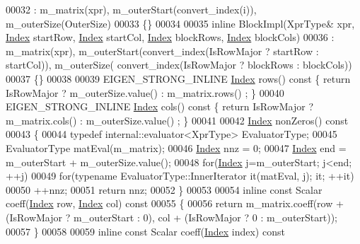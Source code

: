 \begin{DoxyCode}
00032       : m\_matrix(xpr), m\_outerStart(convert\_index(i)), m\_outerSize(OuterSize)
00033     \{\}
00034 
00035     \textcolor{keyword}{inline} BlockImpl(XprType& xpr, \hyperlink{namespace_eigen_a62e77e0933482dafde8fe197d9a2cfde}{Index} startRow, \hyperlink{namespace_eigen_a62e77e0933482dafde8fe197d9a2cfde}{Index} startCol, 
      \hyperlink{namespace_eigen_a62e77e0933482dafde8fe197d9a2cfde}{Index} blockRows, \hyperlink{namespace_eigen_a62e77e0933482dafde8fe197d9a2cfde}{Index} blockCols)
00036       : m\_matrix(xpr), m\_outerStart(convert\_index(IsRowMajor ? startRow : startCol)), m\_outerSize(
      convert\_index(IsRowMajor ? blockRows : blockCols))
00037     \{\}
00038 
00039     EIGEN\_STRONG\_INLINE \hyperlink{namespace_eigen_a62e77e0933482dafde8fe197d9a2cfde}{Index} rows()\textcolor{keyword}{ const }\{ \textcolor{keywordflow}{return} IsRowMajor ? m\_outerSize.value() : m\_matrix.rows()
      ; \}
00040     EIGEN\_STRONG\_INLINE \hyperlink{namespace_eigen_a62e77e0933482dafde8fe197d9a2cfde}{Index} cols()\textcolor{keyword}{ const }\{ \textcolor{keywordflow}{return} IsRowMajor ? m\_matrix.cols() : m\_outerSize.value()
      ; \}
00041 
00042     \hyperlink{namespace_eigen_a62e77e0933482dafde8fe197d9a2cfde}{Index} nonZeros()\textcolor{keyword}{ const}
00043 \textcolor{keyword}{    }\{
00044       \textcolor{keyword}{typedef} internal::evaluator<XprType> EvaluatorType;
00045       EvaluatorType matEval(m\_matrix);
00046       \hyperlink{namespace_eigen_a62e77e0933482dafde8fe197d9a2cfde}{Index} nnz = 0;
00047       \hyperlink{namespace_eigen_a62e77e0933482dafde8fe197d9a2cfde}{Index} end = m\_outerStart + m\_outerSize.value();
00048       \textcolor{keywordflow}{for}(\hyperlink{namespace_eigen_a62e77e0933482dafde8fe197d9a2cfde}{Index} j=m\_outerStart; j<end; ++j)
00049         \textcolor{keywordflow}{for}(\textcolor{keyword}{typename} EvaluatorType::InnerIterator it(matEval, j); it; ++it)
00050           ++nnz;
00051       \textcolor{keywordflow}{return} nnz;
00052     \}
00053 
00054     \textcolor{keyword}{inline} \textcolor{keyword}{const} Scalar coeff(\hyperlink{namespace_eigen_a62e77e0933482dafde8fe197d9a2cfde}{Index} row, \hyperlink{namespace_eigen_a62e77e0933482dafde8fe197d9a2cfde}{Index} col)\textcolor{keyword}{ const}
00055 \textcolor{keyword}{    }\{
00056       \textcolor{keywordflow}{return} m\_matrix.coeff(row + (IsRowMajor ? m\_outerStart : 0), col + (IsRowMajor ? 0 :  m\_outerStart));
00057     \}
00058 
00059     \textcolor{keyword}{inline} \textcolor{keyword}{const} Scalar coeff(\hyperlink{namespace_eigen_a62e77e0933482dafde8fe197d9a2cfde}{Index} index)\textcolor{keyword}{ const}

\end{DoxyCode}
